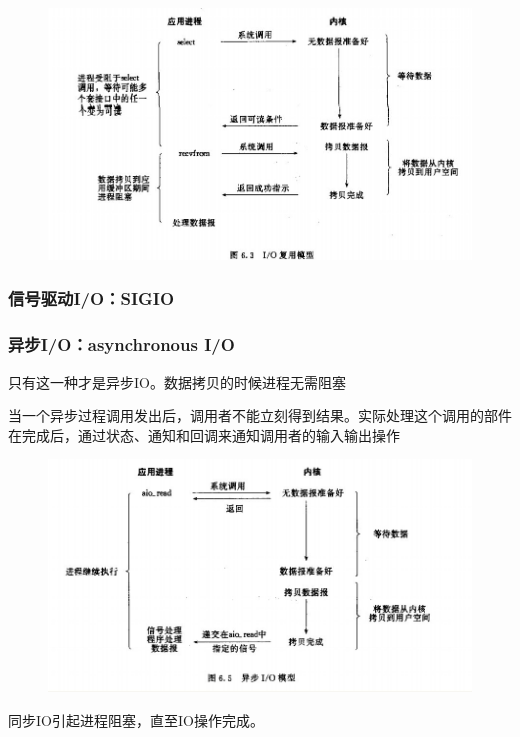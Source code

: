 \documentclass[UTF8,a4paper,12pt]{ctexbook}
\begin{document}
			\begin{figure}[h]
				\centering
				\includegraphics[scale = 0.8]{figures/IOMultiplexing.jpg}
			\end{figure}
			\subsubsection{信号驱动I/O：SIGIO}
			
			\subsubsection{异步I/O：asynchronous I/O}只有这一种才是异步IO。数据拷贝的时候进程无需阻塞
			
			当一个异步过程调用发出后，调用者不能立刻得到结果。实际处理这个调用的部件在完成后，通过状态、通知和回调来通知调用者的输入输出操作
			
			\begin{figure}[h]
				\centering
				\includegraphics[scale = 0.8]{figures/asyIO.jpg}
			\end{figure}
			
			同步IO引起进程阻塞，直至IO操作完成。
			
\end{document}
